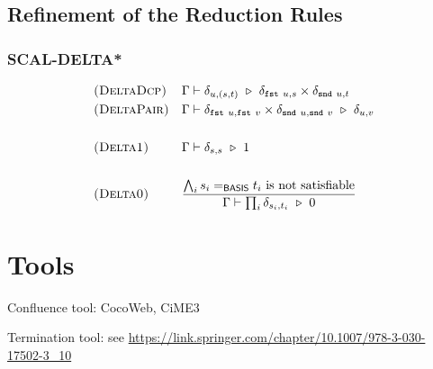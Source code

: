 \subsection{Refinement of the Reduction Rules}

\subsubsection*{\textsf{SCAL-DELTA*}}
\begin{align*}
  & \textsc{(DeltaDcp)} && 
  \Gamma \vdash \delta_{u, (s, t)} \ \triangleright\  \delta_{\texttt{fst}\ u, s} \times \delta_{\texttt{snd}\ u, t} \\
  & \textsc{(DeltaPair)} &&
  \Gamma \vdash \delta_{\texttt{fst}\ u, \texttt{fst}\ v}\times\delta_{\texttt{snd}\ u, \texttt{snd}\ v} \ \triangleright\  \delta_{u, v}\\
  \\ 
  & \textsc{(Delta1)} && 
  \Gamma \vdash \delta_{s, s} \ \triangleright\  1
  \\
  \\
  & \textsc{(Delta0)} && 
  \frac{\bigwedge_i s_i =_\textsf{BASIS} t_i \textrm{ is not satisfiable}}{\Gamma \vdash \prod_i \delta_{s_i, t_i} \ \triangleright\  0}
\end{align*}


\section{Tools}

Confluence tool: CocoWeb, CiME3

Termination tool: see \url{https://link.springer.com/chapter/10.1007/978-3-030-17502-3_10}